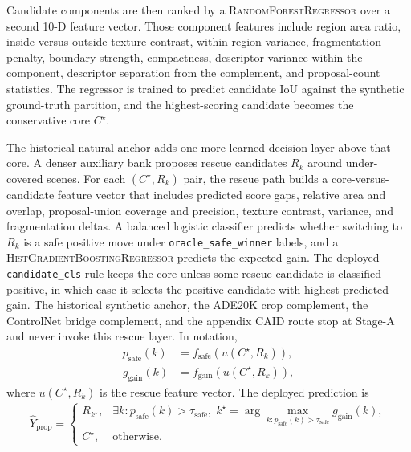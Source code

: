 Candidate components are then ranked by a \textsc{RandomForestRegressor} over a second 10-D feature vector. Those component features include region area ratio, inside-versus-outside texture contrast, within-region variance, fragmentation penalty, boundary strength, compactness, descriptor variance within the component, descriptor separation from the complement, and proposal-count statistics. The regressor is trained to predict candidate IoU against the synthetic ground-truth partition, and the highest-scoring candidate becomes the conservative core $C^\star$.

The historical natural anchor adds one more learned decision layer above that core. A denser auxiliary bank proposes rescue candidates $R_k$ around under-covered scenes. For each $(C^\star, R_k)$ pair, the rescue path builds a core-versus-candidate feature vector that includes predicted score gaps, relative area and overlap, proposal-union coverage and precision, texture contrast, variance, and fragmentation deltas. A balanced logistic classifier predicts whether switching to $R_k$ is a safe positive move under \texttt{oracle\_safe\_winner} labels, and a \textsc{HistGradientBoostingRegressor} predicts the expected gain. The deployed \texttt{candidate\_cls} rule keeps the core unless some rescue candidate is classified positive, in which case it selects the positive candidate with highest predicted gain. The historical synthetic anchor, the ADE20K crop complement, the ControlNet bridge complement, and the appendix CAID route stop at Stage-A and never invoke this rescue layer.
In notation,
\begin{align}
p_{\mathrm{safe}}(k) &= f_{\mathrm{safe}}(u(C^\star, R_k)),\\
g_{\mathrm{gain}}(k) &= f_{\mathrm{gain}}(u(C^\star, R_k)),
\end{align}
where $u(C^\star, R_k)$ is the rescue feature vector. The deployed prediction is
\begin{align}
\hat{Y}_{\mathrm{prop}} =
\begin{cases}
R_{k^\star}, & \exists k : p_{\mathrm{safe}}(k) > \tau_{\mathrm{safe}}, \; k^\star = \arg\max_{k: p_{\mathrm{safe}}(k) > \tau_{\mathrm{safe}}} g_{\mathrm{gain}}(k),\\
C^\star, & \text{otherwise.}
\end{cases}
\end{align}

